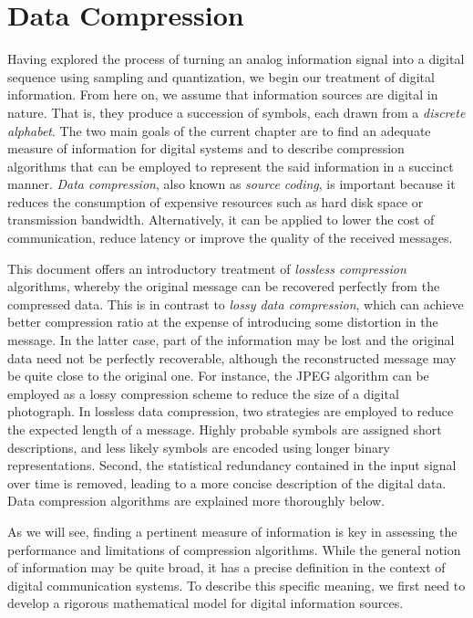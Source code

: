 \chapter{Data Compression}

Having explored the process of turning an analog information signal into a digital sequence using sampling and quantization, we begin our treatment of digital information.
From here on, we assume that information sources are digital in nature.
That is, they produce a succession of symbols, each drawn from a \emph{discrete alphabet}.
The two main goals of the current chapter are to find an adequate measure of information for digital systems and to describe compression algorithms that can be employed to represent the said information in a succinct manner.
\emph{Data compression}, also known as \emph{source coding}, is important because it reduces the consumption of expensive resources such as hard disk space or transmission bandwidth.
Alternatively, it can be applied to lower the cost of communication, reduce latency or improve the quality of the received messages.

This document offers an introductory treatment of \emph{lossless compression} algorithms, whereby the original message can be recovered perfectly from the compressed data.
This is in contrast to \emph{lossy data compression}, which can achieve better compression ratio at the expense of introducing some distortion in the message.
In the latter case, part of the information may be lost and the original data need not be perfectly recoverable, although the reconstructed message may be quite close to the original one.
For instance, the JPEG algorithm can be employed as a lossy compression scheme to reduce the size of a digital photograph.
In lossless data compression, two strategies are employed to reduce the expected length of a message.
Highly probable symbols are assigned short descriptions, and less likely symbols are encoded using longer binary representations.
Second, the statistical redundancy contained in the input signal over time is removed, leading to a more concise description of the digital data.
Data compression algorithms are explained more thoroughly below.

As we will see, finding a pertinent measure of information is key in assessing the performance and limitations of compression algorithms.
While the general notion of information may be quite broad, it has a precise definition in the context of digital communication systems.
To describe this specific meaning, we first need to develop a rigorous mathematical model for digital information sources.


